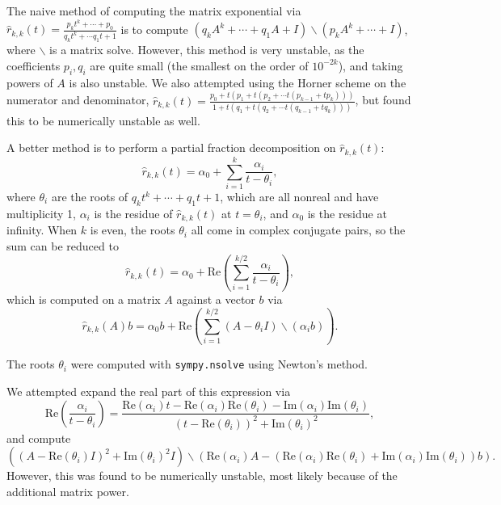 
The naive method of computing the matrix exponential via $\hat{r}_{k,
  k}(t)=\frac{p_kt^k + \cdots + p_0}{q_kt^k + \cdots q_1t + 1}$
is to compute $(q_kA^k + \cdots + q_1A + I)\backslash(p_kA^k + \cdots + I)$, where
$\backslash$ is a matrix solve. However, this method is very unstable, as the
coefficients $p_i,q_i$ are quite small (the smallest on the order of
$10^{-2k}$), and taking powers of $A$ is also unstable. We also attempted
using the Horner scheme on the numerator and denominator, $\hat{r}_{k,
  k}(t)=\frac{p_0 + t(p_1 + t(p_2 + \cdots t(p_{k-1} + tp_k)))}{1 + t(q_1 +
  t(q_2 + \cdots t(q_{k-1} + tq_k)))}$, but found this to be numerically
unstable as well.

A better method is to perform a partial fraction decomposition on $\hat{r}_{k,
  k}(t)$:
\begin{equation}
  \hat{r}_{k, k}(t) = \alpha_0 + \sum_{i=1}^k \frac{\alpha_i}{t - \theta_i},
\end{equation}
where $\theta_i$ are the roots of $q_kt^k + \cdots + q_1t + 1$, which are all
nonreal and have multiplicity 1, $\alpha_i$ is the residue of
$\hat{r}_{k, k}(t)$ at $t=\theta_i$, and $\alpha_0$ is the residue at
infinity. When $k$ is even, the roots $\theta_i$ all come in complex conjugate
pairs, so the sum can be reduced to
\begin{equation}
  \hat{r}_{k, k}(t) = \alpha_0 + \mathrm{Re}\left(\sum_{i=1}^{k/2} \frac{\alpha_i}{t - \theta_i}\right),
\end{equation}
which is computed on a matrix $A$ against a vector $b$ via
\begin{equation}
  \hat{r}_{k, k}(A)b = \alpha_0b + \mathrm{Re}\left(\sum_{i=1}^{k/2} (A -
    \theta_i I)\backslash(\alpha_i b) \right).
\end{equation}

The roots $\theta_i$ were computed with \texttt{sympy.nsolve} using Newton's
method.

We attempted expand the real part of this expression via
\begin{equation}
\mathrm{Re}\left(\frac{\alpha_i}{t - \theta_i}\right) = \frac{\mathrm{Re}{(\alpha_{i})}t - \mathrm{Re}{(\alpha_{i})} \mathrm{Re}{(\theta_{i})} - \mathrm{Im}{(\alpha_{i})} \mathrm{Im}{(\theta_{i})}}{\left(t - \mathrm{Re}{(\theta_{i})}\right)^{2} + \mathrm{Im}{(\theta_{i})}^{2}},
\end{equation}
and compute
\begin{equation}
\left(\left(A - \mathrm{Re}{(\theta_{i})I}\right)^{2} +
  \mathrm{Im}{(\theta_{i})}^{2}I\right)\backslash \left(\mathrm{Re}{(\alpha_{i})}A - (\mathrm{Re}{(\alpha_{i})} \mathrm{Re}{(\theta_{i})} + \mathrm{Im}{(\alpha_{i})} \mathrm{Im}{(\theta_{i})})b\right).
\end{equation}
However, this was found to be numerically unstable, most likely because of the
additional matrix power. %
